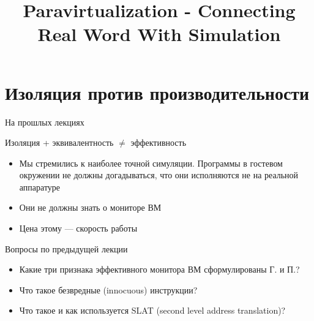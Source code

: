 
\title{Paravirtualization - Connecting Real Word With Simulation}



\begin{frame}
    \maketitle
\end{frame}

\begin{frame}
    \tableofcontents
\end{frame}

\section[Изоляция]{Изоляция против производительности}

\begin{frame}{На прошлых лекциях}

Изоляция + эквивалентность $\neq$ эффективность

\begin{itemize}
\item Мы стремились к наиболее точной симуляции. Программы в гостевом окружении не должны догадываться, что они исполняются не на реальной аппаратуре
\item Они не должны знать о мониторе ВМ
\item Цена этому — скорость работы

\end{itemize}

\end{frame}

\begin{frame}{Вопросы по предыдущей лекции}

\begin{itemize}
\item Какие три признака эффективного монитора ВМ сформулированы Г. и П.?
\item Что такое безвредные (innocuous) инструкции?
\item Что такое и как используется SLAT (second level address translation)?


\end{itemize}

\end{frame}



